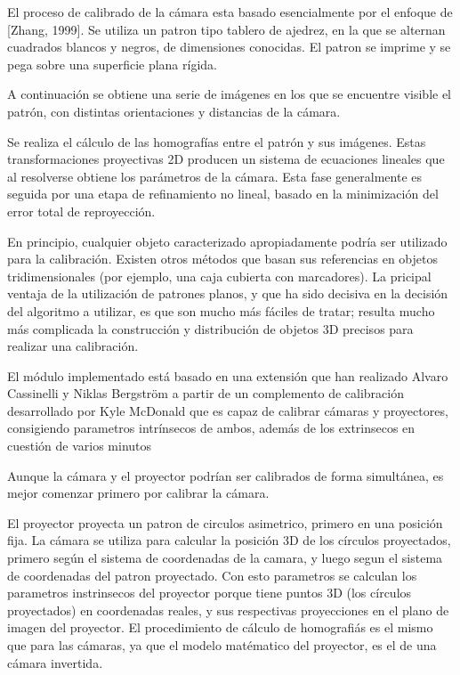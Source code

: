 El proceso de calibrado de la cámara esta basado esencialmente por el enfoque de [Zhang, 1999]. Se utiliza un patron tipo tablero de ajedrez, en la que se alternan cuadrados blancos y negros, de dimensiones conocidas. El patron se imprime y se pega sobre una superficie plana rígida.

A continuación se obtiene una serie de imágenes en los que se encuentre visible el patrón, con distintas orientaciones y distancias de la cámara. 

Se realiza el cálculo de las homografías entre el patrón y sus imágenes. Estas transformaciones proyectivas 2D producen un sistema de ecuaciones lineales que al resolverse obtiene los parámetros de la cámara. Esta fase generalmente es seguida por una etapa de refinamiento no lineal, basado en la minimización del error total de reproyección.

En principio, cualquier objeto caracterizado apropiadamente podría ser utilizado para la calibración. Existen otros métodos que basan sus referencias en objetos tridimensionales (por ejemplo, una caja cubierta con marcadores).  
La pricipal ventaja de la utilización de patrones planos, y que ha sido decisiva en la decisión del algoritmo a utilizar, es que son mucho más fáciles de tratar; resulta mucho más complicada la construcción y distribución de objetos 3D precisos para realizar una calibración.

El módulo implementado está basado en una extensión que han realizado Alvaro Cassinelli y Niklas Bergström a partir de un complemento de calibración desarrollado por Kyle McDonald que es capaz de calibrar cámaras y proyectores, consigiendo parametros intrínsecos de ambos, además de los extrinsecos en cuestión de varios minutos 

Aunque la cámara y el proyector podrían ser calibrados de forma simultánea, es mejor comenzar primero por calibrar la cámara.

El proyector proyecta un patron de circulos asimetrico, primero en una posición fija. La cámara se utiliza para calcular la posición 3D de los círculos proyectados, primero según el sistema de coordenadas de la camara, y luego segun el sistema de coordenadas del patron proyectado. Con esto parametros se calculan los parametros instrinsecos del proyector porque tiene puntos 3D (los círculos proyectados) en coordenadas reales, y sus respectivas proyecciones en el plano de imagen del proyector. El procedimiento de cálculo de homografiás es el mismo que para las cámaras, ya que el modelo matématico del proyector, es el de una cámara invertida. 


